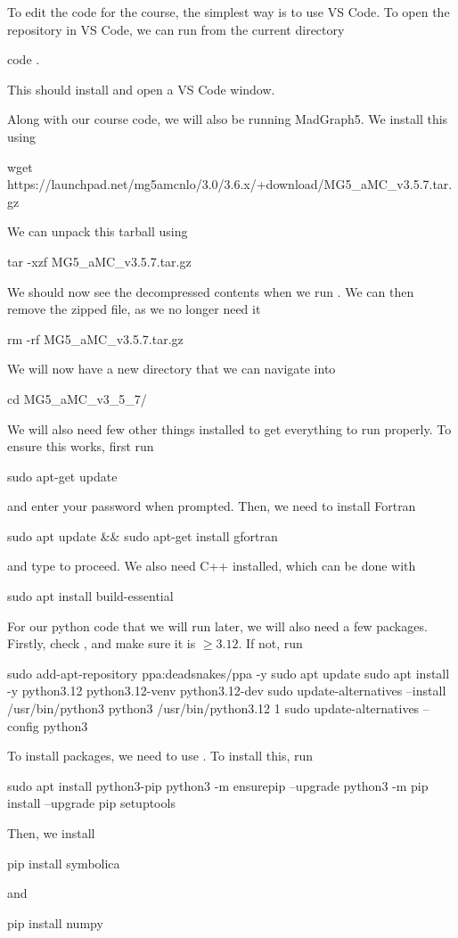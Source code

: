 To edit the code for the course, the simplest way is to use VS Code. To open the repository in VS Code, we can run from the current directory
\begin{codeenv}
    code .
\end{codeenv}
This should install and open a VS Code window.

Along with our course code, we will also be running MadGraph5. We install this using
\begin{codeenv}
     wget https://launchpad.net/mg5amcnlo/3.0/3.6.x/+download/MG5_aMC_v3.5.7.tar.gz
\end{codeenv}
We can unpack this tarball using
\begin{codeenv}
     tar -xzf MG5_aMC_v3.5.7.tar.gz
\end{codeenv}
We should now see the decompressed contents when we run . We can then remove the zipped file, as we no longer need it
\begin{codeenv}
     rm -rf MG5_aMC_v3.5.7.tar.gz
\end{codeenv}
We will now have a new directory that we can navigate into
\begin{codeenv}
     cd MG5_aMC_v3_5_7/
\end{codeenv}

We will also need few other things installed to get everything to run properly. To ensure this works, first run
\begin{codeenv}
   sudo apt-get update
\end{codeenv}
and enter your password when prompted. Then, we need to install Fortran
\begin{codeenv}
     sudo apt update && sudo apt-get install gfortran
\end{codeenv}
and type  to proceed. We also need C++ installed, which can be done with
\begin{codeenv}
     sudo apt install build-essential
\end{codeenv}

For our python code that we will run later, we will also need a few packages. Firstly, check , and make sure it is $\geq 3.12$. If not, run
\begin{codeenv}
   sudo add-apt-repository ppa:deadsnakes/ppa -y 
   sudo apt update 
   sudo apt install -y python3.12 python3.12-venv python3.12-dev 
   sudo update-alternatives --install /usr/bin/python3 python3 /usr/bin/python3.12 1 
   sudo update-alternatives --config python3
\end{codeenv}
To install packages, we need to use . To install this, run %
\begin{codeenv}
    sudo apt install python3-pip
    python3 -m ensurepip --upgrade 
    python3 -m pip install --upgrade pip setuptools
\end{codeenv}
Then, we install 
\begin{codeenv}
    pip install symbolica
\end{codeenv}
and 
\begin{codeenv}
    pip install numpy
\end{codeenv}

